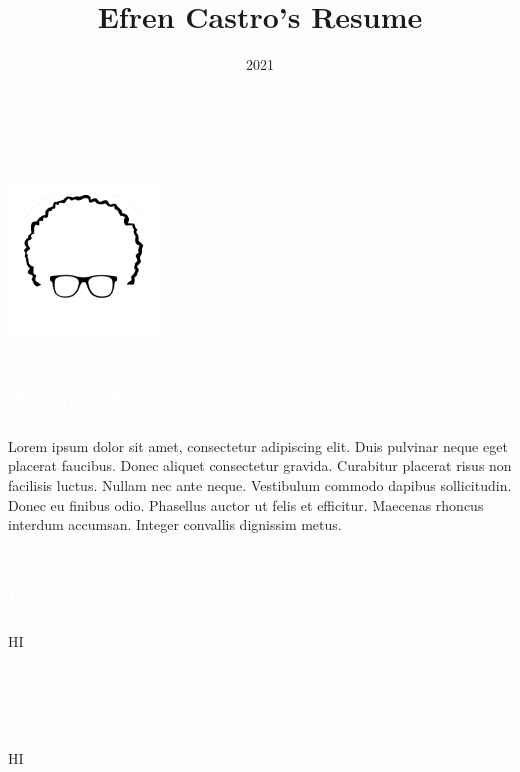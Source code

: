 \documentclass[11pt,oneside,a4paper,titlepage]{article}
\title{Efren Castro's Resume}
\date{2021}
\begin{document}

\begin{tcolorbox}
  \begin{minipage}{15cm}
    \huge{\textcolor{white}{\scshape{Efren Castro}}}\\
    \normalsize{\textcolor{white}{\scshape{Full Stack Web Developer}}}
  \end{minipage}
  \begin{minipage}{4.5cm}
    \includegraphics[width=4cm,trim=-3cm 5cm 3cm 0]{Logo.png}
  \end{minipage}
\end{tcolorbox}

\begin{tcolorbox}
  \begin{minipage}[t]{8cm}
    \vspace*{-0.5cm}
    \begin{tcolorbox}[grow to left by=0.55cm,colback=themeBorder,colframe=white,arc=0mm,]
      \section*{\textcolor{white}{About Me}}
        Lorem ipsum dolor sit amet, consectetur adipiscing elit. Duis pulvinar neque eget placerat faucibus. Donec aliquet consectetur gravida. Curabitur placerat risus non facilisis luctus. Nullam nec ante neque. Vestibulum commodo dapibus sollicitudin. Donec eu finibus odio. Phasellus auctor ut felis et efficitur. Maecenas rhoncus interdum accumsan. Integer convallis dignissim metus.  
      \section*{\textcolor{white}{Contact}}
        HI
      \section*{\textcolor{white}{Skills}}
        HI
    \end{tcolorbox}
  \end{minipage}
\end{tcolorbox}
\end{document}
